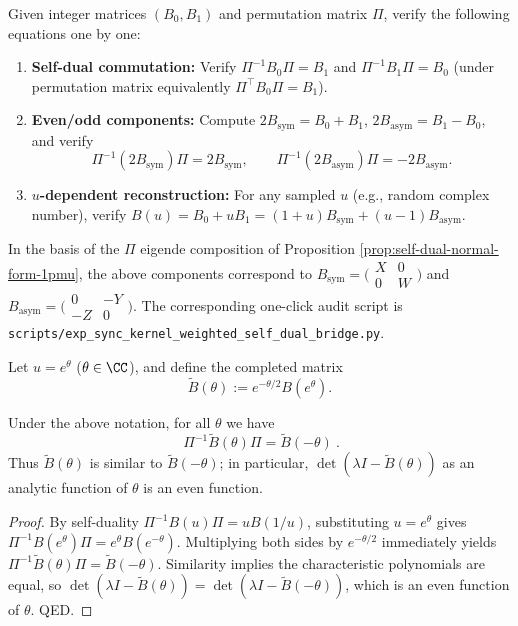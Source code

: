 \begin{remark}\label{rem:sync-kernel-even-odd-bridge}
Given integer matrices \((B_0,B_1)\) and permutation matrix \(\Pi\), verify the following equations one by one:
\begin{enumerate}
  \item \textbf{Self-dual commutation:} Verify \(\Pi^{-1}B_0\Pi=B_1\) and \(\Pi^{-1}B_1\Pi=B_0\) (under permutation matrix equivalently \(\Pi^\top B_0\Pi=B_1\)).
  \item \textbf{Even/odd components:} Compute \(2B_{\mathrm{sym}}=B_0+B_1\), \(2B_{\mathrm{asym}}=B_1-B_0\), and verify
  \[
  \Pi^{-1}(2B_{\mathrm{sym}})\Pi=2B_{\mathrm{sym}},\qquad
  \Pi^{-1}(2B_{\mathrm{asym}})\Pi=-2B_{\mathrm{asym}}.
  \]
  \item \textbf{\(u\)-dependent reconstruction:} For any sampled \(u\) (e.g., random complex number), verify
  \(
  B(u)=B_0+uB_1=(1+u)B_{\mathrm{sym}}+(u-1)B_{\mathrm{asym}}
  \).
\end{enumerate}
In the basis of the \(\Pi\) eigende composition of Proposition \ref{prop:self-dual-normal-form-1pmu}, the above components correspond to
\(
B_{\mathrm{sym}}=\bigl(\begin{smallmatrix}X&0\\0&W\end{smallmatrix}\bigr)
\)
and
\(
B_{\mathrm{asym}}=\bigl(\begin{smallmatrix}0&-Y\\-Z&0\end{smallmatrix}\bigr)
\).
The corresponding one-click audit script is \texttt{scripts/exp\_sync\_kernel\_weighted\_self\_dual\_bridge.py}.
\end{remark}

\begin{definition}\label{def:completed-matrix}
Let \(u=e^{\theta}\) (\(\theta\in\CC\)), and define the completed matrix
\[
\widetilde B(\theta):=e^{-\theta/2}B(e^{\theta}).
\]
\end{definition}

\begin{lemma}\label{lem:completed-similarity}
Under the above notation, for all \(\theta\) we have
\[
\boxed{\ \Pi^{-1}\widetilde B(\theta)\Pi=\widetilde B(-\theta)\ }.
\]
Thus \(\widetilde B(\theta)\) is similar to \(\widetilde B(-\theta)\); in particular,
\(\det(\lambda I-\widetilde B(\theta))\) as an analytic function of \(\theta\) is an even function.
\end{lemma}
\begin{proof}
By self-duality \(\Pi^{-1}B(u)\Pi=uB(1/u)\), substituting \(u=e^{\theta}\) gives
\(
\Pi^{-1}B(e^\theta)\Pi=e^\theta B(e^{-\theta})
\).
Multiplying both sides by \(e^{-\theta/2}\) immediately yields
\(
\Pi^{-1}\widetilde B(\theta)\Pi=\widetilde B(-\theta)
\).
Similarity implies the characteristic polynomials are equal, so \(\det(\lambda I-\widetilde B(\theta))=\det(\lambda I-\widetilde B(-\theta))\), which is an even function of \(\theta\). QED.
\end{proof}

